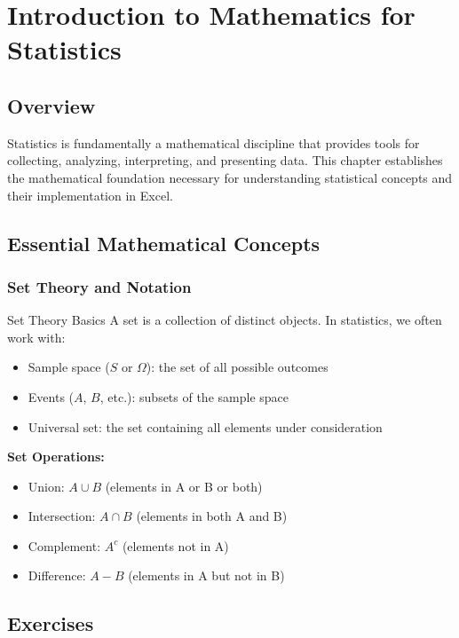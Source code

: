 \documentclass[12pt,a4paper]{book}
\begin{document}
\chapter{Introduction to Mathematics for Statistics}

\section{Overview}

Statistics is fundamentally a mathematical discipline that provides tools for collecting, analyzing, interpreting, and presenting data. This chapter establishes the mathematical foundation necessary for understanding statistical concepts and their implementation in Excel.

\section{Essential Mathematical Concepts}

\subsection{Set Theory and Notation}

\begin{definition}{Set Theory Basics}
A set is a collection of distinct objects. In statistics, we often work with:
\begin{itemize}
    \item Sample space ($S$ or $\Omega$): the set of all possible outcomes
    \item Events ($A$, $B$, etc.): subsets of the sample space
    \item Universal set: the set containing all elements under consideration
\end{itemize}
\end{definition}

\textbf{Set Operations:}
\begin{itemize}
    \item Union: $A \cup B$ (elements in A or B or both)
    \item Intersection: $A \cap B$ (elements in both A and B)
    \item Complement: $A^c$ (elements not in A)
    \item Difference: $A - B$ (elements in A but not in B)
\end{itemize}

\section{Exercises}
\end{document}
